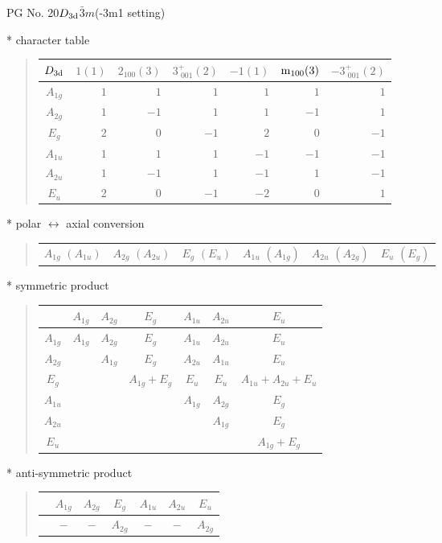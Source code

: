 \documentclass[fleqn,8pt,landscape]{jsarticle}
\begin{document}
\setcounter{MaxMatrixCols}{32}

\renewcommand{\tablename}{Table~}
\renewcommand{\figurename}{Figure~}
\begin{center}
\LARGE
PG No. 20\quad$D_{\rm 3d}$\quad$\bar{3}m$\quad(-3m1 setting)\quad[ trigonal ]
\end{center}

* character table
\begin{quote}
\begin{tabular}{crrrrrr} \hline \hline
$ D_{\rm 3d} $ & $ 1(1) $ & $ 2{}_{100}(3) $ & $ 3^{+}_{\,\,001}(2) $ & $ -1(1) $ & $ {\rm m}_{100}(3) $ & $ -3^{+}_{\,\,001}(2) $ \\ \hline
$ A_{1g} $ & $ 1 $ & $ 1 $ & $ 1 $ & $ 1 $ & $ 1 $ & $ 1 $ \\
$ A_{2g} $ & $ 1 $ & $ -1 $ & $ 1 $ & $ 1 $ & $ -1 $ & $ 1 $ \\
$ E_{g} $ & $ 2 $ & $ 0 $ & $ -1 $ & $ 2 $ & $ 0 $ & $ -1 $ \\
$ A_{1u} $ & $ 1 $ & $ 1 $ & $ 1 $ & $ -1 $ & $ -1 $ & $ -1 $ \\
$ A_{2u} $ & $ 1 $ & $ -1 $ & $ 1 $ & $ -1 $ & $ 1 $ & $ -1 $ \\
$ E_{u} $ & $ 2 $ & $ 0 $ & $ -1 $ & $ -2 $ & $ 0 $ & $ 1 $ \\
 \hline \hline
\end{tabular}
\end{quote}

* polar $\leftrightarrow$ axial conversion
\begin{quote}
\begin{tabular}{cccccc}
$ A_{1g}\,\,(A_{1u}) $ & $ A_{2g}\,\,(A_{2u}) $ & $ E_{g}\,\,(E_{u}) $ & $ A_{1u}\,\,(A_{1g}) $ & $ A_{2u}\,\,(A_{2g}) $ & $ E_{u}\,\,(E_{g}) $
\end{tabular}
\end{quote}

* symmetric product
\begin{quote}
\begin{tabular}{c|cccccc} \hline \hline
 & $ A_{1g} $ & $ A_{2g} $ & $ E_{g} $ & $ A_{1u} $ & $ A_{2u} $ & $ E_{u} $ \\ \hline
$ A_{1g} $ & $ A_{1g} $ & $ A_{2g} $ & $ E_{g} $ & $ A_{1u} $ & $ A_{2u} $ & $ E_{u} $ \\
$ A_{2g} $ & $  $ & $ A_{1g} $ & $ E_{g} $ & $ A_{2u} $ & $ A_{1u} $ & $ E_{u} $ \\
$ E_{g} $ & $  $ & $  $ & $ A_{1g} + E_{g} $ & $ E_{u} $ & $ E_{u} $ & $ A_{1u} + A_{2u} + E_{u} $ \\
$ A_{1u} $ & $  $ & $  $ & $  $ & $ A_{1g} $ & $ A_{2g} $ & $ E_{g} $ \\
$ A_{2u} $ & $  $ & $  $ & $  $ & $  $ & $ A_{1g} $ & $ E_{g} $ \\
$ E_{u} $ & $  $ & $  $ & $  $ & $  $ & $  $ & $ A_{1g} + E_{g} $ \\
 \hline \hline
\end{tabular}
\end{quote}

* anti-symmetric product
\begin{quote}
\begin{tabular}{ccccccc} \hline \hline
 & $ A_{1g} $ & $ A_{2g} $ & $ E_{g} $ & $ A_{1u} $ & $ A_{2u} $ & $ E_{u} $ \\ \hline
$  $ & $ - $ & $ - $ & $ A_{2g} $ & $ - $ & $ - $ & $ A_{2g} $ \\
 \hline \hline
\end{tabular}
\end{quote}
\end{document}
